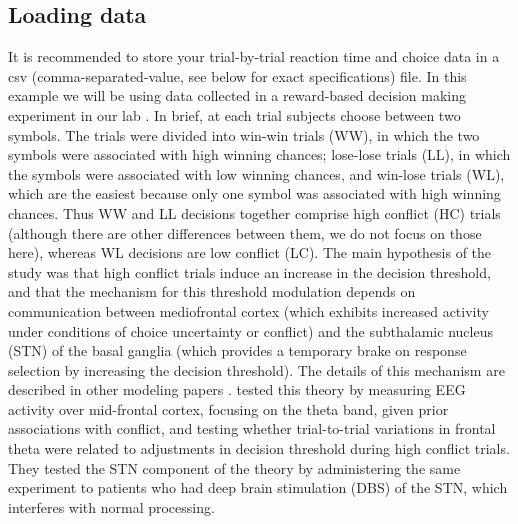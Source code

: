 \documentclass[letterpaper,10pt,english]{article}
\begin{document}
\subsection*{Loading data}
\label{demo:loading-data}
It is recommended to store your trial-by-trial reaction time and
choice data in a csv (comma-separated-value, see below for exact
specifications) file. In this example we will be using data collected
in a reward-based decision making experiment in our lab
\citep{CavanaghWieckiCohenEtAl11}. In brief, at each trial subjects
choose between two symbols. The trials were divided into win-win
trials (WW), in which the two symbols were associated with high
winning chances; lose-lose trials (LL), in which the symbols were
associated with low winning chances, and win-lose trials (WL), which
are the easiest because only one symbol was associated with high
winning chances. Thus WW and LL decisions together comprise high
conflict (HC) trials (although there are other differences between
them, we do not focus on those here), whereas WL decisions are low
conflict (LC).  The main hypothesis of the study was that high
conflict trials induce an increase in the decision threshold, and that
the mechanism for this threshold modulation depends on communication
between mediofrontal cortex (which exhibits increased activity under
conditions of choice uncertainty or conflict) and the subthalamic
nucleus (STN) of the basal ganglia (which provides a temporary brake
on response selection by increasing the decision threshold). The
details of this mechanism are described in other modeling papers
\citep[e.g.][]{RatcliffFrank12}. \citet{CavanaghWieckiCohenEtAl11}
tested this theory by measuring EEG activity over mid-frontal cortex,
focusing on the theta band, given prior associations with conflict,
and testing whether trial-to-trial variations in frontal theta were
related to adjustments in decision threshold during high conflict
trials. They tested the STN component of the theory by administering
the same experiment to patients who had deep brain stimulation (DBS)
of the STN, which interferes with normal processing.
\end{document}
